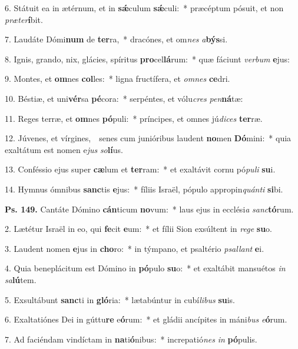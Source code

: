 6. Státuit ea in ætérnum, et in \textbf{s\'{\ae}}culum \textbf{s\'{\ae}}culi:~* præcéptum pósuit, et non \textit{præ}\textit{ter}\textbf{í}bit.

7. Laudáte Dómi\textbf{num} de \textbf{ter}ra,~* dracónes, et om\textit{nes} \textit{a}\textbf{býs}si.

8. Ignis, grando, nix, glácies, spíritus \textbf{pro}cel\textbf{lá}rum:~* quæ fáciunt \textit{ver}\textit{bum} \textbf{e}jus:

9. Montes, et \textbf{om}nes \textbf{col}les:~* ligna fructífera, et \textit{om}\textit{nes} \textbf{ce}dri.

10. Béstiæ, et uni\textbf{vér}sa \textbf{pé}cora:~* serpéntes, et vólu\textit{cres} \textit{pen}\textbf{ná}tæ:

11. Reges terræ, et \textbf{om}nes \textbf{pó}puli:~* príncipes, et omnes jú\textit{di}\textit{ces} \textbf{ter}ræ.

12. Júvenes, et vírgines,~\GreDagger\ senes cum junióribus laudent \textbf{no}men \textbf{Dó}mini:~* quia exaltátum est nomen e\textit{jus} \textit{so}\textbf{lí}us.

13. Conféssio ejus super \textbf{cæ}lum et \textbf{ter}ram:~* et exaltávit cornu pó\textit{pu}\textit{li} \textbf{su}i.

14. Hymnus ómnibus \textbf{sanc}tis \textbf{e}jus:~* fíliis Israël, pópulo appropin\textit{quán}\textit{ti} \textbf{si}bi.

\textbf{Ps. 149.} Cantáte Dómino \textbf{cán}ticum \textbf{no}vum:~* laus ejus in ecclési\textit{a} \textit{sanc}\textbf{tó}rum.

2. Lætétur Israël in eo, qui \textbf{fe}cit \textbf{e}um:~* et fílii Sion exsúltent in \textit{re}\textit{ge} \textbf{su}o.

3. Laudent nomen \textbf{e}jus in \textbf{cho}ro:~* in týmpano, et psaltério \textit{psal}\textit{lant} \textbf{e}i.

4. Quia beneplácitum est Dómino in \textbf{pó}pulo \textbf{su}o:~* et exaltábit mansuétos \textit{in} \textit{sa}\textbf{lú}tem.

5. Exsultábunt \textbf{sanc}ti in \textbf{gló}ria:~* lætabúntur in cubí\textit{li}\textit{bus} \textbf{su}is.

6. Exaltatiónes Dei in gúttu\textbf{re} e\textbf{ó}rum:~* et gládii ancípites in máni\textit{bus} \textit{e}\textbf{ó}rum.

7. Ad faciéndam vindíctam in \textbf{na}ti\textbf{ó}nibus:~* increpatió\textit{nes} \textit{in} \textbf{pó}pulis.

